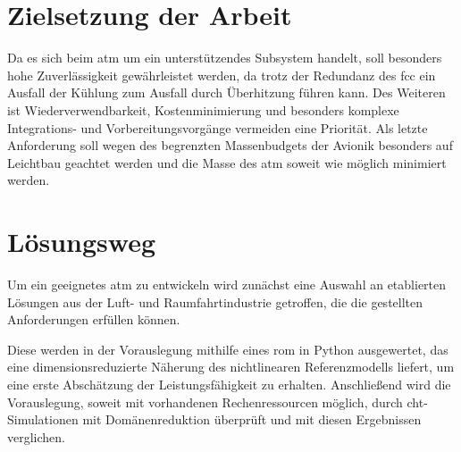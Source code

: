 \section{Zielsetzung der Arbeit}

Da es sich beim \ac{atm} um ein unterstützendes Subsystem handelt, soll besonders hohe Zuverlässigkeit gewährleistet werden, da trotz der
Redundanz des \ac{fcc} ein Ausfall der Kühlung zum Ausfall durch Überhitzung führen kann.
Des Weiteren ist Wiederverwendbarkeit, Kostenminimierung und besonders komplexe Integrations- und Vorbereitungsvorgänge
vermeiden eine Priorität.
Als letzte Anforderung soll wegen des begrenzten Massenbudgets der Avionik
besonders auf Leichtbau geachtet werden und die Masse des \ac{atm} soweit wie möglich minimiert werden.

\section{Lösungsweg}

Um ein geeignetes \ac{atm} zu entwickeln wird zunächst eine Auswahl an etablierten Lösungen aus der Luft- und Raumfahrtindustrie
getroffen, die die gestellten Anforderungen erfüllen können.

Diese werden in der Vorauslegung mithilfe eines \ac{rom} in Python ausgewertet, das eine dimensionsreduzierte Näherung des nichtlinearen Referenzmodells liefert, um eine erste Abschätzung der Leistungsfähigkeit zu erhalten.
Anschließend wird die Vorauslegung, soweit mit vorhandenen Rechenressourcen möglich, durch \ac{cht}-Simulationen mit Domänenreduktion
überprüft und mit diesen Ergebnissen verglichen.